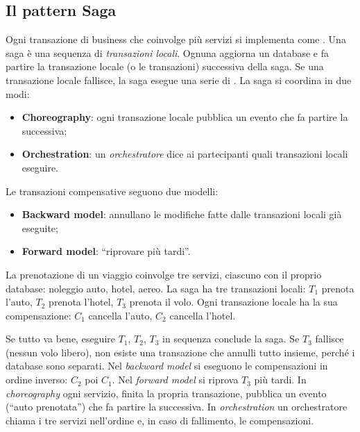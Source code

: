 \subsection{Il pattern Saga}

Ogni transazione di business che coinvolge più servizi si implementa come . Una saga è una sequenza di
\emph{transazioni locali}. Ognuna aggiorna un database e fa partire la transazione locale (o le transazioni) successiva
della saga. Se una transazione locale fallisce, la saga esegue una serie di .
La saga si coordina in due modi:
\begin{itemize}
  \item \textbf{Choreography}: ogni transazione locale pubblica un evento che fa partire la successiva;
  \item \textbf{Orchestration}: un \emph{orchestratore} dice ai partecipanti quali transazioni locali eseguire.
\end{itemize}
Le transazioni compensative seguono due modelli:
\begin{itemize}
  \item \textbf{Backward model}: annullano le modifiche fatte dalle transazioni locali già eseguite;
  \item \textbf{Forward model}: ``riprovare più tardi''.
\end{itemize}

\begin{esempio}
La prenotazione di un viaggio coinvolge tre servizi, ciascuno con il proprio database: noleggio auto, hotel, aereo.
La saga ha tre transazioni locali: $T_1$ prenota l'auto, $T_2$ prenota l'hotel, $T_3$ prenota il volo. Ogni
transazione locale ha la sua compensazione: $C_1$ cancella l'auto, $C_2$ cancella l'hotel.

Se tutto va bene, eseguire $T_1$, $T_2$, $T_3$ in sequenza conclude la saga. Se $T_3$ fallisce (nessun volo libero),
non esiste una transazione che annulli tutto insieme, perché i database sono separati. Nel \emph{backward model} si
eseguono le compensazioni in ordine inverso: $C_2$ poi $C_1$. Nel \emph{forward model} si riprova $T_3$ più tardi.
In \emph{choreography} ogni servizio, finita la propria transazione, pubblica un evento (``auto prenotata'') che
fa partire la successiva. In \emph{orchestration} un orchestratore chiama i tre servizi nell'ordine e, in caso di
fallimento, le compensazioni.
\end{esempio}

